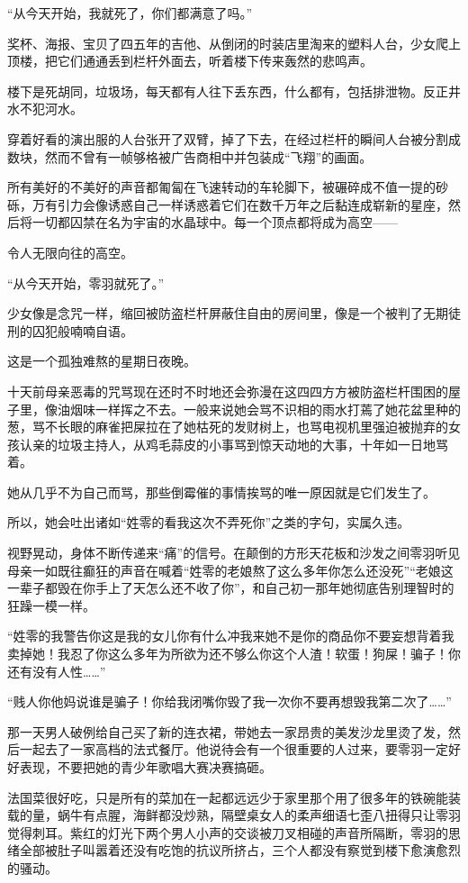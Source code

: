 \documentclass[UTF8, scheme = chinese, openany]{ctexbook}
\begin{document}
“从今天开始，我就死了，你们都满意了吗。”

奖杯、海报、宝贝了四五年的吉他、从倒闭的时装店里淘来的塑料人台，少女爬上顶楼，把它们通通丢到栏杆外面去，听着楼下传来轰然的悲鸣声。

楼下是死胡同，垃圾场，每天都有人往下丢东西，什么都有，包括排泄物。反正井水不犯河水。

穿着好看的演出服的人台张开了双臂，掉了下去，在经过栏杆的瞬间人台被分割成数块，然而不曾有一帧够格被广告商相中并包装成“飞翔”的画面。

所有美好的不美好的声音都匍匐在飞速转动的车轮脚下，被碾碎成不值一提的砂砾，万有引力会像诱惑自己一样诱惑着它们在数千万年之后黏连成崭新的星座，然后将一切都囚禁在名为宇宙的水晶球中。每一个顶点都将成为高空——

令人无限向往的高空。

“从今天开始，零羽就死了。”

少女像是念咒一样，缩回被防盗栏杆屏蔽住自由的房间里，像是一个被判了无期徒刑的囚犯般喃喃自语。

\vspace{1.5em}

这是一个孤独难熬的星期日夜晚。

十天前母亲恶毒的咒骂现在还时不时地还会弥漫在这四四方方被防盗栏杆围困的屋子里，像油烟味一样挥之不去。一般来说她会骂不识相的雨水打蔫了她花盆里种的葱，骂不长眼的麻雀把屎拉在了她枯死的发财树上，也骂电视机里强迫被抛弃的女孩认亲的垃圾主持人，从鸡毛蒜皮的小事骂到惊天动地的大事，十年如一日地骂着。

她从几乎不为自己而骂，那些倒霉催的事情挨骂的唯一原因就是它们发生了。

所以，她会吐出诸如“姓零的看我这次不弄死你”之类的字句，实属久违。

视野晃动，身体不断传递来“痛”的信号。在颠倒的方形天花板和沙发之间零羽听见母亲一如既往癫狂的声音在喊着“姓零的老娘熬了这么多年你怎么还没死”“老娘这一辈子都毁在你手上了天怎么还不收了你”，和自己初一那年她彻底告别理智时的狂躁一模一样。

“姓零的我警告你这是我的女儿你有什么冲我来她不是你的商品你不要妄想背着我卖掉她！我忍了你这么多年为所欲为还不够么你这个人渣！软蛋！狗屎！骗子！你还有没有人性……”

“贱人你他妈说谁是骗子！你给我闭嘴你毁了我一次你不要再想毁我第二次了……”

那一天男人破例给自己买了新的连衣裙，带她去一家昂贵的美发沙龙里烫了发，然后一起去了一家高档的法式餐厅。他说待会有一个很重要的人过来，要零羽一定好好表现，不要把她的青少年歌唱大赛决赛搞砸。

法国菜很好吃，只是所有的菜加在一起都远远少于家里那个用了很多年的铁碗能装载的量，蜗牛有点腥，海鲜都没炒熟，隔壁桌女人的柔声细语七歪八扭得只让零羽觉得刺耳。紫红的灯光下两个男人小声的交谈被刀叉相碰的声音所隔断，零羽的思绪全部被肚子叫嚣着还没有吃饱的抗议所挤占，三个人都没有察觉到楼下愈演愈烈的骚动。
\end{document}
